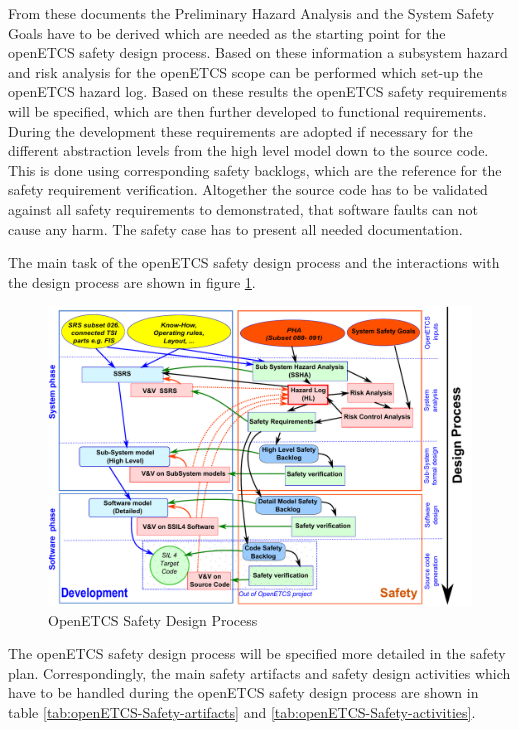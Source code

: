 \documentclass{template/openetcs_article}
\begin{document}
From these documents the Preliminary Hazard Analysis and the System Safety Goals have to be derived which are needed as the starting point for the openETCS safety design process. Based on these information a subsystem hazard and risk analysis for the openETCS scope can be performed which set-up the openETCS hazard log. Based on these results the openETCS safety requirements will be specified, which are then further developed to functional requirements. During the development these requirements are adopted if necessary for the different abstraction levels from the high level model down to the source code. This is done using corresponding safety backlogs, which are the reference for the safety requirement verification. Altogether the source code has to be validated against all safety requirements to demonstrated, that software faults can not cause any harm. The safety case has to present all needed documentation.
 
The main task of the openETCS safety design process and the interactions with the design process are shown in figure \ref{fig:WholeSafetyProcess}.

\begin{figure}[htbp]
\centering
\includegraphics[width=0.8\linewidth]{WholeSafetyProcess}
\caption{OpenETCS Safety Design Process}
\label{fig:WholeSafetyProcess}
\end{figure}

The openETCS safety design process will be specified more detailed in the safety plan. Correspondingly, the main safety artifacts and safety design activities which have to be handled during the openETCS safety design process are shown in table \ref{tab:openETCS-Safety-artifacts} and \ref{tab:openETCS-Safety-activities}.
\end{document}
